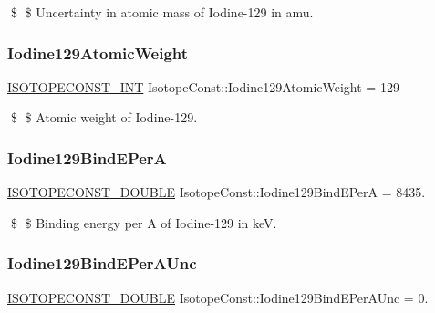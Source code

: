 \$ \$ Uncertainty in atomic mass of Iodine-\/129 in amu. \mbox{\label{group___isotope_const-_iodine-_i129_ga3adc40808e6799f66e0bf9b3997d97a5}} 
\subsubsection{\texorpdfstring{Iodine129\+Atomic\+Weight}{Iodine129AtomicWeight}}
{\footnotesize\ttfamily \mbox{\hyperlink{group___isotope_const-_macros_ga5f18360b3e99483a35c32d789e62621c}{I\+S\+O\+T\+O\+P\+E\+C\+O\+N\+S\+T\+\_\+\+I\+NT}} Isotope\+Const\+::\+Iodine129\+Atomic\+Weight = 129}

\$ \$ Atomic weight of Iodine-\/129. \mbox{\label{group___isotope_const-_iodine-_i129_ga074a3315e80c9606736c0dd9251442d4}} 
\subsubsection{\texorpdfstring{Iodine129\+Bind\+E\+PerA}{Iodine129BindEPerA}}
{\footnotesize\ttfamily \mbox{\hyperlink{group___isotope_const-_macros_ga8f45a7272ce02c0b4c65c44636ed719a}{I\+S\+O\+T\+O\+P\+E\+C\+O\+N\+S\+T\+\_\+\+D\+O\+U\+B\+LE}} Isotope\+Const\+::\+Iodine129\+Bind\+E\+PerA = 8435.}

\$ \$ Binding energy per A of Iodine-\/129 in keV. \mbox{\label{group___isotope_const-_iodine-_i129_ga5dbf99ca3639559a59b8407a1c9ba891}} 
\subsubsection{\texorpdfstring{Iodine129\+Bind\+E\+Per\+A\+Unc}{Iodine129BindEPerAUnc}}
{\footnotesize\ttfamily \mbox{\hyperlink{group___isotope_const-_macros_ga8f45a7272ce02c0b4c65c44636ed719a}{I\+S\+O\+T\+O\+P\+E\+C\+O\+N\+S\+T\+\_\+\+D\+O\+U\+B\+LE}} Isotope\+Const\+::\+Iodine129\+Bind\+E\+Per\+A\+Unc = 0.}

